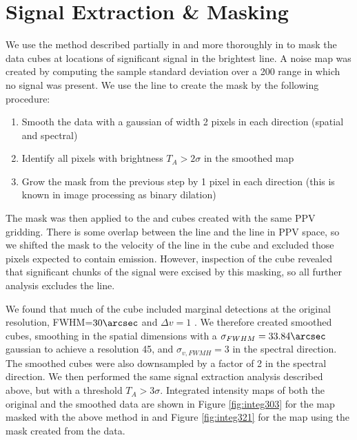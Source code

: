 \section{Signal Extraction \& Masking}
\label{sec:signal}
We use the method described partially in \citet{Ao2013a} and more thoroughly in
\citet{Dame2011b} to mask the data cubes at locations of significant signal in 
the brightest line. 
A noise map was created by computing the sample standard deviation over a
200 \kms range in which no signal was present.
We use the \para \threeohthree line to create the mask by
the following procedure:

\begin{enumerate}
    \item Smooth the data with a gaussian of width 2 pixels in each direction
        (spatial and spectral)
    \item Identify all pixels with brightness $T_A > 2\sigma$ in the smoothed
        map
    \item Grow the mask from the previous step by 1 pixel in each direction
        (this is known in image processing as binary dilation)
\end{enumerate}

The \para \threeohthree mask was then applied to the \threetwoone and
\threetwotwo cubes created with the same PPV gridding.  There is some overlap
between the \methanol \fourtwotwo line and the \para \threetwotwo line in PPV
space, so we shifted the \para \threeohthree mask to the velocity of the
\methanol line in the \para \threetwotwo cube and excluded those pixels expected
to contain \methanol emission.
However, inspection of the \threetwotwo cube revealed that significant chunks
of the \threetwotwo signal were excised by this masking, so all further
analysis excludes the \threetwotwo line.

We found that much of the cube included marginal detections at the original
resolution, FWHM=$30\arcsec$ and $\Delta v=1$ \kms.  We therefore created
smoothed cubes, smoothing in the spatial dimensions with a
$\sigma_{FWHM}=33.84\arcsec$ gaussian to achieve a resolution 45\arcsec, and
$\sigma_{v, FWMH} = 3$ \kms in the spectral direction.  The smoothed cubes were
also downsampled by a factor of 2 in the spectral direction.  We then performed
the same signal extraction analysis described above, but with a threshold $T_A
> 3\sigma$.  Integrated intensity maps of both the original and the smoothed
data are shown in Figure \ref{fig:integ303} for the \threeohthree map masked
with the above method in and Figure \ref{fig:integ321} for the \threetwoone map
using the mask created from the \threeohthree data.

